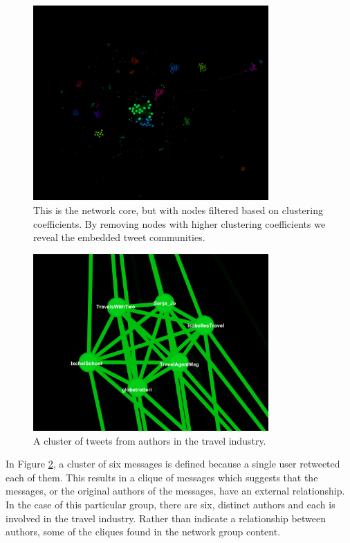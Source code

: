 \documentclass[a4paper, 11pt, titlepage]{article}
\begin{document}
\begin{figure}[h]
\centering
\label{fig:rt_net_core_clusters}
\includegraphics[width=90mm]{../figures/rt_net_core_clusters}
\caption{This is the network core, but with nodes filtered based on clustering coefficients.  By removing nodes with higher clustering coefficients we reveal the embedded tweet communities.}
\end{figure}

\begin{figure}[h]
\centering
\includegraphics[width=90mm]{../figures/rt_net_travel}
\caption{A cluster of tweets from authors in the travel industry.}
\label{fig:rt_net_travel}
\end{figure}

In Figure \ref{fig:rt_net_travel}, a cluster of six messages is defined because a single user retweeted each of them.  This results in a clique of messages which suggests that the messages, or the original authors of the messages, have an external relationship.  In the case of this particular group, there are six, distinct authors and each is involved in the travel industry.  Rather than indicate a relationship between authors, some of the cliques found in the network group content.
\end{document}
